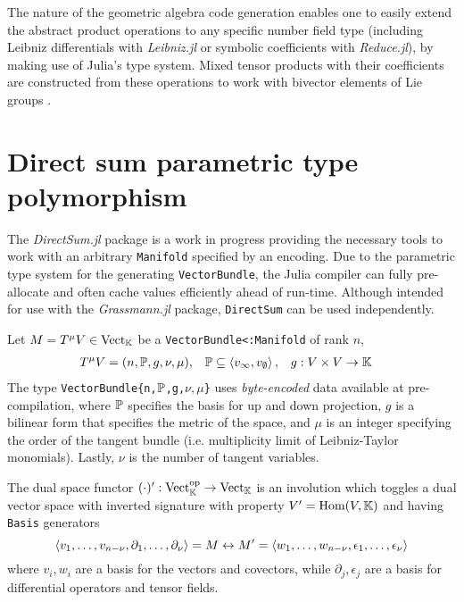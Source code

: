\documentclass{juliacon}
\begin{document}
The nature of the geometric algebra code generation enables one to easily extend the abstract product operations to any specific number field type (including Leibniz differentials with \textit{Leibniz.jl} or symbolic coefficients with \textit{Reduce.jl}), by making use of Julia's type system. Mixed tensor products with their coefficients are constructed from these operations to work with bivector elements of Lie groups \cite{hestenes}\cite{shahshahani}.

\section{Direct sum parametric type polymorphism}

The \textit{DirectSum.jl} package is a work in progress providing the necessary tools to work with an arbitrary \verb`Manifold` specified by an encoding. Due to the parametric type system for the generating \verb`VectorBundle`, the Julia compiler can fully pre-allocate and often cache values efficiently ahead of run-time.
Although intended for use with the \textit{Grassmann.jl} package, \verb`DirectSum` can be used independently.

\begin{definition}
	Let $M = T^\mu V\in\text{Vect}_{\mathbb{K}}$ be a \verb`VectorBundle<:Manifold` of rank $n$,
	\begin{align*}
		T^\mu V &= (n,\mathbb{P},g,\nu,\mu), & \mathbb{P} &\subseteq\left\langle v_\infty,v_\emptyset \right\rangle, & g &:V\times V\rightarrow\mathbb{K}
	\end{align*}
	The type \verb+VectorBundle{n,+$\mathbb{P}$\verb+,g,+$\nu,\mu$\verb+}+ uses \textit{byte-encoded} data available at pre-compilation, where
	$\mathbb{P}$ specifies the basis for up and down projection,
	$g$ is a bilinear form that specifies the metric of the space,
	and $\mu$ is an integer specifying the order of the tangent bundle (i.e. multiplicity limit of Leibniz-Taylor monomials). Lastly, $\nu$ is the number of tangent variables.
\end{definition}
The dual space functor $(\cdot)':\text{Vect}_{\mathbb{K}}^\text{op}\rightarrow\text{Vect}_{\mathbb{K}}$
is an involution which toggles a dual vector space with inverted signature with property $V' = \text{Hom}(V,\mathbb{K})$ and having \verb`Basis` generators
$$\left\langle v_1,\dots,v_{n-\nu},\partial_1,\dots,\partial_\nu \right\rangle=M\leftrightarrow M' = \left\langle w_1,\dots,w_{n-\nu},\epsilon_1,\dots,\epsilon_\nu \right\rangle$$
where $v_i,w_i$ are a basis for the vectors and covectors, while $\partial_j,\epsilon_j$ are a basis for differential operators and tensor fields.
\end{document}
